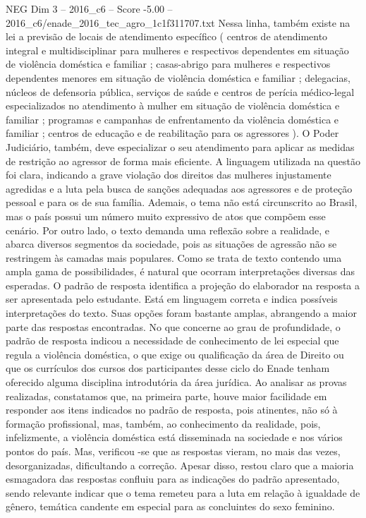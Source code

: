 \begin{textsample}{NEG Dim 3 – 2016\_c6 – Score -5.00 – 2016\_c6/enade\_2016\_tec\_agro\_1c1f311707.txt}
Nessa linha, também existe na lei a previsão de locais de atendimento específico ( centros de atendimento integral e multidisciplinar para mulheres e respectivos dependentes em situação de violência doméstica e familiar ; casas-abrigo para mulheres e respectivos dependentes menores em situação de violência doméstica e familiar ; delegacias, núcleos de defensoria pública, serviços de saúde e centros de perícia médico-legal especializados no atendimento à mulher em situação de violência doméstica e familiar ; programas e campanhas de enfrentamento da violência doméstica e familiar ; centros de educação e de reabilitação para os agressores ).
O Poder Judiciário, também, deve especializar o seu atendimento para aplicar as medidas de restrição ao agressor de forma mais eficiente.
A linguagem utilizada na questão foi clara, indicando a grave violação dos direitos das mulheres injustamente agredidas e a luta pela busca de sanções adequadas aos agressores e de proteção pessoal e para os de sua família.
Ademais, o tema não está circunscrito ao Brasil, mas o país possui um número muito expressivo de atos que compõem esse cenário.
Por outro lado, o texto demanda uma reflexão sobre a realidade, e abarca diversos segmentos da sociedade, pois as situações de agressão não se restringem às camadas mais populares.
Como se trata de texto contendo uma ampla gama de possibilidades, é natural que ocorram interpretações diversas das esperadas.
O padrão de resposta identifica a projeção do elaborador na resposta a ser apresentada pelo estudante.
Está em linguagem correta e indica possíveis interpretações do texto.
Suas opções foram bastante amplas, abrangendo a maior parte das respostas encontradas.
No que concerne ao grau de profundidade, o padrão de resposta indicou a necessidade de conhecimento de lei especial que regula a violência doméstica, o que exige ou qualificação da área de Direito ou que os currículos dos cursos dos participantes desse ciclo do Enade tenham oferecido alguma disciplina introdutória da área jurídica.
Ao analisar as provas realizadas, constatamos que, na primeira parte, houve maior facilidade em responder aos itens indicados no padrão de resposta, pois atinentes, não só à formação profissional, mas, também, ao conhecimento da realidade, pois, infelizmente, a violência doméstica está disseminada na sociedade e nos vários pontos do país.
Mas, verificou -se que as respostas vieram, no mais das vezes, desorganizadas, dificultando a correção.
Apesar disso, restou claro que a maioria esmagadora das respostas confluiu para as indicações do padrão apresentado, sendo relevante indicar que o tema remeteu para a luta em relação à igualdade de gênero, temática candente em especial para as concluintes do sexo feminino.

\end{textsample}
